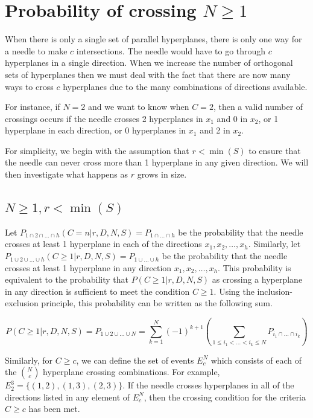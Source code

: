 \documentclass{article}
\begin{document}
\section{Probability of crossing $N\ge 1$}
When there is only a single set of parallel hyperplanes, there is only one way for a needle to make
$c$ intersections. The needle would have to go through $c$ hyperplanes in a single direction.
When we increase the number of orthogonal sets of hyperplanes then we must deal with the fact that
there are now many ways to cross $c$ hyperplanes due to the many combinations of directions available.

For instance, if $N=2$ and we want to know when $C=2$, then a valid number of crossings occurs if the
needle crosses 2 hyperplanes in $x_1$ and 0 in $x_2$, or 1 hyperplane in each direction, or 0 hyperplanes
in $x_1$ and 2 in $x_2$.

For simplicity, we begin with the assumption that $r<\min(S)$ to ensure that the needle can never cross
more than 1 hyperplane in any given direction. We will then investigate what happens as $r$ grows in
size.

\subsection{$N\ge 1, r<\min(S)$}
Let $P_{1\cap2\cap\hdots\cap h}(C=n|r,D,N,S)=P_{1\cap\hdots\cap h}$ be the probability that the
needle crosses at least 1 hyperplane in each of the directions $x_1, x_2, \hdots, x_h$. Similarly,
let $P_{1\cup2\cup\hdots\cup h}(C\ge 1|r,D,N,S)=P_{1\cup\hdots\cup h}$ be the probability that
the needle crosses at least 1 hyperplane in any direction $x_1, x_2, \hdots, x_h$. This probability
is equivalent to the probability that $P(C\ge 1|r,D,N,S)$ as crossing a hyperplane in any 
direction is sufficient to meet the condition $C\ge 1$. Using the inclusion-exclusion principle,
this probability can be written as the following sum.

\begin{equation}
	P(C\ge 1|r, D, N, S) = P_{1\cup2\cup\hdots\cup N} = \sum_{k=1}^N (-1)^{k+1}\left(\sum_{1\le i_1 < \hdots < i_k \le N}P_{i_1 \cap \hdots \cap i_k} \right)
\end{equation}

Similarly, for $C\ge c$, we can define the set of events $E_c^N$ which consists of each of the
$N \choose c$ hyperplane crossing combinations. For example, $E_2^3=\{(1,2), (1,3), (2,3)\}$.
If the needle crosses hyperplanes in all of the directions listed in any element of $E_c^N$,
then the crossing condition for the criteria $C \ge c$ has been met.
\end{document}
